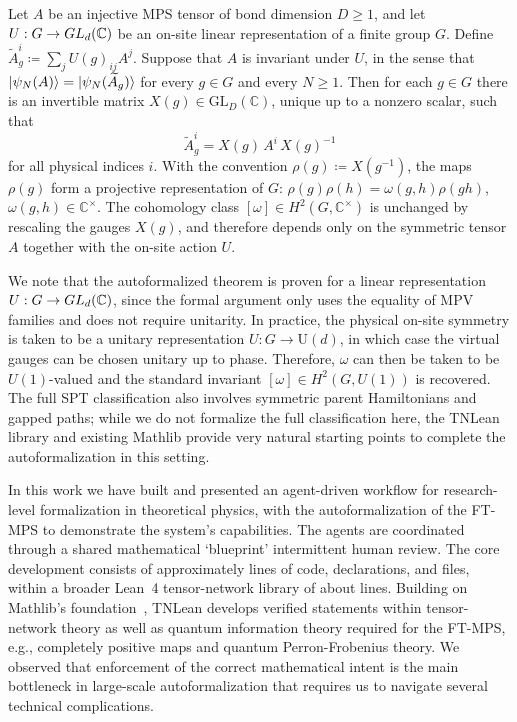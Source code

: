 \documentclass[aps,prl,twocolumn,superscriptaddress,longbibliography,10pt,footinbib]{revtex4-2}
\begin{document}
\begin{theorem}\label{thm:spt-invariant}
    Let $A$ be an injective MPS tensor of bond dimension $D\geq 1$, and let
    $U:G\to GL_d(\mathbb{C})$ be an on-site linear representation of a finite group
    $G$. Define $\tilde A_g^i \coloneqq \sum_j {U(g)}_{ij}A^j$.
    Suppose that $A$ is invariant under $U$, in the sense that
    $\ket{\psi_N(A)}=\ket{\psi_N(\widetilde A_g)}$ for every $g\in G$ and every
    $N\geq 1$. Then for each $g\in G$ there is an invertible matrix
    $X(g)\in \mathrm{GL}_D(\mathbb C)$, unique up to a nonzero scalar, such that
    \begin{equation}
        \tilde A_g^i = X(g)\,A^i\,{X(g)}^{-1}
    \end{equation}
    for all physical indices $i$. With the convention $\rho(g)\coloneqq X(g^{-1})$,
    the maps $\rho(g)$ form a projective representation of $G$: $\rho(g)\rho(h)=\omega(g,h)\rho(gh)$, $\omega(g,h)\in\mathbb C^\times$.
    The cohomology class $[\omega]\in H^2(G,\mathbb C^\times)$ is unchanged
    by rescaling the gauges $X(g)$, and therefore depends only on the
    symmetric tensor $A$ together with the on-site action $U$.
\end{theorem}
\noindent We note that the autoformalized theorem is proven for a linear representation $U:G\to {GL}_d(\mathbb{C})$, since the formal argument only uses the equality of MPV families and does not require unitarity. In practice, the physical on-site symmetry is taken to be a unitary representation $U:G\to\mathrm{U}(d)$, in which case the virtual gauges can be chosen unitary up to phase. Therefore,  $\omega$ can then be taken to be $U(1)$-valued and the standard invariant $[\omega]\in H^2(G,U(1))$ is recovered. The full SPT classification also involves symmetric parent Hamiltonians and gapped paths; while we do not formalize the full classification here, the TNLean library and existing Mathlib provide very natural starting points to complete the autoformalization in this setting.



%
In this work we have built and presented an agent-driven workflow for research-level formalization in theoretical physics, with the autoformalization of the FT-MPS to demonstrate the system's capabilities. The agents are coordinated through a shared mathematical `blueprint' intermittent human review. The core development consists of approximately \nLOC{} lines of code, \nDecls{} declarations, and \nFiles{} files, within a broader Lean~4 tensor-network library of about \nLOCfull{} lines. Building on Mathlib's foundation~\cite{2026Leanprovercommunity,TheMathlibCommunity2020Lean}, TNLean develops verified statements within tensor-network theory as well as quantum information theory required for the FT-MPS, e.g., completely positive maps and quantum Perron-Frobenius theory. We observed that enforcement of the correct mathematical intent is the main bottleneck in large-scale autoformalization that requires us to navigate several technical complications.
\end{document}
